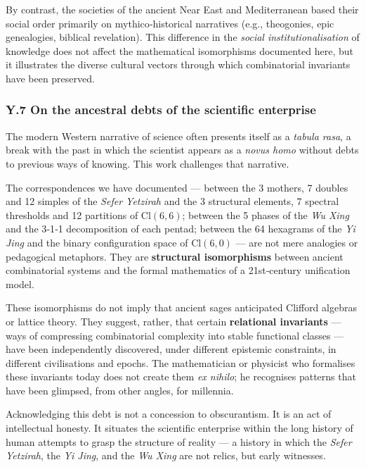 \documentclass[11pt]{article}
\begin{document}
By contrast, the societies of the ancient Near East and Mediterranean
based their social order primarily on mythico‑historical narratives
(e.g., theogonies, epic genealogies, biblical revelation). This
difference in the \emph{social institutionalisation} of knowledge does
not affect the mathematical isomorphisms documented here, but it
illustrates the diverse cultural vectors through which combinatorial
invariants have been preserved.

\hypertarget{y.7-on-the-ancestral-debts-of-the-scientific-enterprise}{%
\subsubsection{Y.7 On the ancestral debts of the scientific
enterprise}\label{y.7-on-the-ancestral-debts-of-the-scientific-enterprise}}

The modern Western narrative of science often presents itself as a
\emph{tabula rasa}, a break with the past in which the scientist appears
as a \emph{novus homo} without debts to previous ways of knowing. This
work challenges that narrative.

The correspondences we have documented --- between the 3 mothers, 7
doubles and 12 simples of the \emph{Sefer Yetzirah} and the 3 structural
elements, 7 spectral thresholds and 12 partitions of
\(\mathrm{Cl}(6,6)\); between the 5 phases of the \emph{Wu Xing} and the
3‑1‑1 decomposition of each pentad; between the 64 hexagrams of the
\emph{Yi Jing} and the binary configuration space of
\(\mathrm{Cl}(6,0)\) --- are not mere analogies or pedagogical
metaphors. They are \textbf{structural isomorphisms} between ancient
combinatorial systems and the formal mathematics of a 21st‑century
unification model.

These isomorphisms do not imply that ancient sages anticipated Clifford
algebras or lattice theory. They suggest, rather, that certain
\textbf{relational invariants} --- ways of compressing combinatorial
complexity into stable functional classes --- have been independently
discovered, under different epistemic constraints, in different
civilisations and epochs. The mathematician or physicist who formalises
these invariants today does not create them \emph{ex nihilo}; he
recognises patterns that have been glimpsed, from other angles, for
millennia.

Acknowledging this debt is not a concession to obscurantism. It is an
act of intellectual honesty. It situates the scientific enterprise
within the long history of human attempts to grasp the structure of
reality --- a history in which the \emph{Sefer Yetzirah}, the \emph{Yi
Jing}, and the \emph{Wu Xing} are not relics, but early witnesses.
\end{document}
